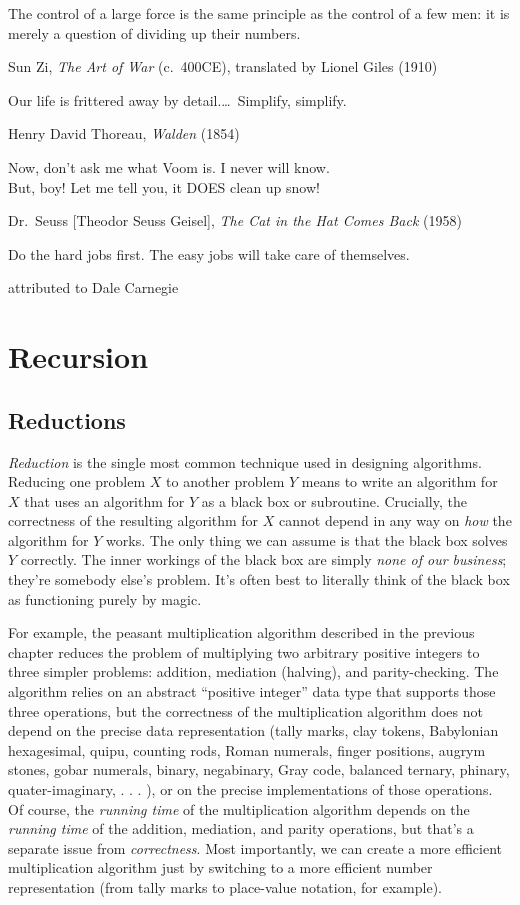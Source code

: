\epigraph{The control of a large force is the same principle as the control of a few men: it is merely a question of dividing up their numbers.}{Sun Zi, \textit{The Art of War} (c.~400CE), translated by Lionel Giles (1910)}

\epigraph{Our life is frittered away by detail.\dots\ Simplify, simplify.}{Henry David Thoreau, \textit{Walden} (1854)}

\epigraph{Now, don’t ask me what Voom is. I never will know.\\
But, boy! Let me tell you, it DOES clean up snow!}{Dr.~Seuss [Theodor Seuss Geisel], \textit{The Cat in the Hat Comes Back} (1958)}

\epigraph{Do the hard jobs first. The easy jobs will take care of themselves.}{attributed to Dale Carnegie}

\chapter{Recursion}
\label{ch:1}

\section{Reductions}
\label{sec:1.1}

\emph{Reduction} is the single most common technique used in designing algorithms. Reducing one problem $X$ to another problem $Y$ means to write an algorithm for $X$ that uses an algorithm for $Y$ as a black box or subroutine. Crucially, the correctness of the resulting algorithm for $X$ cannot depend in any way on \emph{how} the algorithm for $Y$ works. The only thing we can assume is that the black box solves $Y$ correctly. The inner workings of the black box are simply \emph{none of our business}; they’re somebody else’s problem. It’s often best to literally think of the black box as functioning purely by magic.

For example, the peasant multiplication algorithm described in the previous chapter reduces the problem of multiplying two arbitrary positive integers to three simpler problems: addition, mediation (halving), and parity-checking. The algorithm relies on an abstract “positive integer” data type that supports those three operations, but the correctness of the multiplication algorithm does not depend on the precise data representation (tally marks, clay tokens, Babylonian hexagesimal, quipu, counting rods, Roman numerals, finger positions, augrym stones, gobar numerals, binary, negabinary, Gray code, balanced ternary, phinary, quater-imaginary, . . . ), or on the precise implementations of those operations. Of course, the \emph{running time} of the multiplication algorithm depends on the \emph{running time} of the addition, mediation, and parity operations, but that’s a separate issue from \emph{correctness}. Most importantly, we can create a more efficient multiplication algorithm just by switching to a more efficient number representation (from tally marks to place-value notation, for example).


